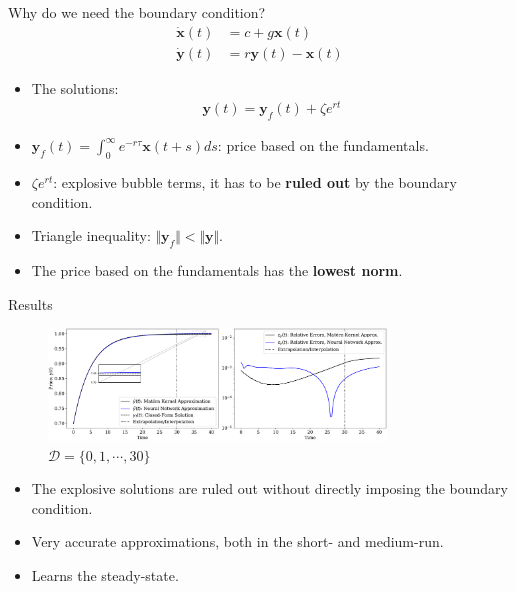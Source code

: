 \documentclass[aspectratio=169,10pt]{beamer}
\newcommand{\emphcolor}[1]{\textbf{\textcolor{emphcolorval}{#1}}}
\begin{document}
\begin{frame}{Why do we need the boundary condition?}
	\begin{align*}
		\dot{\mathbf{x}}(t) &= c + g \mathbf{x}(t) \\
		\dot{\mathbf{y}}(t) &= r \mathbf{y}(t) - \mathbf{x}(t)
	\end{align*}
	\begin{itemize}
		\item The solutions: 
		\begin{align*}
			\mathbf{y}(t) = \mathbf{y}_f(t) + \zeta e^{rt}
		\end{align*}
		\item $\mathbf{y}_f(t) = \int_0^\infty e^{-r\tau} \mathbf{x}(t+s)ds$: price based on the fundamentals.
		\vspace{0.1in}
		\item $\zeta e^{rt}$: explosive bubble terms, it has to be \emphcolor{ruled out} by the boundary condition.
		\vspace{0.1in} 
		\item Triangle inequality: $\Vert \mathbf{y}_f\Vert < \Vert \mathbf{y}\Vert$.
		\vspace{0.1in}
		\item The price based on the fundamentals has the \emphcolor{lowest norm}.
	\end{itemize}
\end{frame}

\begin{frame}{Results}
	\begin{figure}[t!]
		\centering
		\includegraphics[width=0.8\textwidth]{figs/asset_pricing_contiguous.pdf}
		\caption*{$\mathcal{D} = \{0,1,\cdots,30\}$}
		\vspace{-4mm}
	\end{figure}
	\begin{itemize}
		\item The explosive solutions are ruled out without directly imposing the boundary condition.
		\vspace{0.1in}
		\item Very accurate approximations, both in the short- and medium-run.
		\vspace{0.1in}
		\item Learns the steady-state.
	\end{itemize}
\end{frame}
\end{document}

